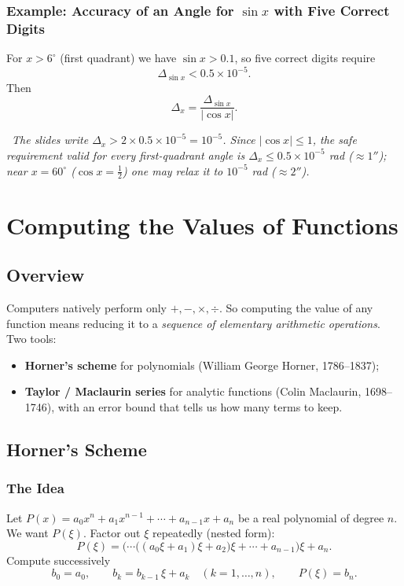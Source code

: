 \documentclass[hidelinks]{article}
\newcommand{\callout}[1]{\par\smallskip\noindent{\color{capri}$\blacktriangleright$}\ \textit{#1}\par\smallskip}
\newcommand{\abs}[1]{\left|#1\right|}
\begin{document}
\subsubsection{Example: Accuracy of an Angle for $\sin x$ with Five Correct Digits}

For $x>6^\circ$ (first quadrant) we have $\sin x>0.1$, so five correct digits require
\[
\Delta_{\sin x}<0.5\times10^{-5}.
\]
Then
\[
\Delta_x=\frac{\Delta_{\sin x}}{\abs{\cos x}} .
\]
\callout{The slides write $\Delta_x>2\times0.5\times10^{-5}=10^{-5}$. Since $\abs{\cos x}\le1$, the safe requirement valid for every first-quadrant angle is $\Delta_x\le0.5\times10^{-5}$ rad ($\approx1''$); near $x=60^\circ$ ($\cos x=\tfrac12$) one may relax it to $10^{-5}$ rad ($\approx2''$).}
\section{Computing the Values of Functions}

\subsection{Overview}

Computers natively perform only $+,-,\times,\div$. So computing the value of any function means reducing it to a \emph{sequence of elementary arithmetic operations}. Two tools:
\begin{itemize}
    \item \textbf{Horner's scheme} for polynomials (William George Horner, 1786--1837);
    \item \textbf{Taylor / Maclaurin series} for analytic functions (Colin Maclaurin, 1698--1746), with an error bound that tells us how many terms to keep.
\end{itemize}

\subsection{Horner's Scheme}

\subsubsection{The Idea}

Let $P(x)=a_0x^n+a_1x^{n-1}+\cdots+a_{n-1}x+a_n$ be a real polynomial of degree $n$. We want $P(\xi)$. Factor out $\xi$ repeatedly (nested form):
\[
P(\xi)=\Big(\cdots\big((a_0\xi+a_1)\xi+a_2\big)\xi+\cdots+a_{n-1}\Big)\xi+a_n .
\]
Compute successively
\[
b_0=a_0,\qquad b_k=b_{k-1}\,\xi+a_k\quad(k=1,\dots,n),\qquad P(\xi)=b_n .
\]
\end{document}
